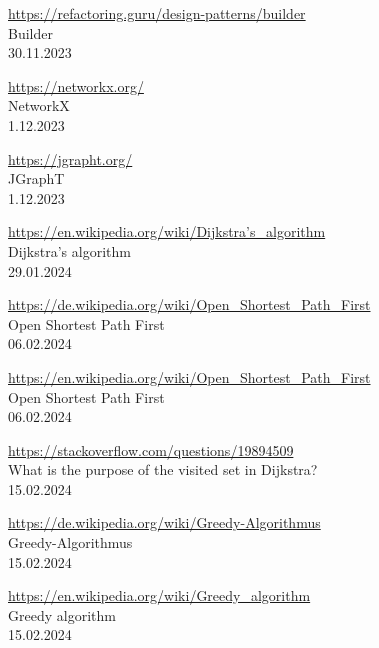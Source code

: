 \begin{thebibliography}{999}
    \href{https://refactoring.guru/design-patterns/builder}{https://refactoring.guru/design-patterns/builder}\\
    Builder\\
    30.11.2023

    \href{https://networkx.org/}{https://networkx.org/}\\
    NetworkX\\
    1.12.2023 

    \href{https://jgrapht.org/}{https://jgrapht.org/}\\
    JGraphT\\
    1.12.2023

    \href{https://en.wikipedia.org/wiki/Dijkstra's_algorithm}{https://en.wikipedia.org/wiki/Dijkstra's\_algorithm}\\
    Dijkstra's algorithm\\
    29.01.2024

    \href{https://de.wikipedia.org/wiki/Open_Shortest_Path_First}{https://de.wikipedia.org/wiki/Open\_Shortest\_Path\_First}\\
    Open Shortest Path First\\
    06.02.2024

    \href{https://en.wikipedia.org/wiki/Open_Shortest_Path_First}{https://en.wikipedia.org/wiki/Open\_Shortest\_Path\_First}\\
    Open Shortest Path First\\
    06.02.2024

    \href{https://stackoverflow.com/questions/19894509}{https://stackoverflow.com/questions/19894509}\\
    What is the purpose of the visited set in Dijkstra?\\
    15.02.2024

    \href{https://de.wikipedia.org/wiki/Greedy-Algorithmus}{https://de.wikipedia.org/wiki/Greedy-Algorithmus}\\
    Greedy-Algorithmus\\
    15.02.2024

    \href{https://en.wikipedia.org/wiki/Greedy_algorithm}{https://en.wikipedia.org/wiki/Greedy\_algorithm}\\
    Greedy algorithm\\
    15.02.2024


\end{thebibliography}
